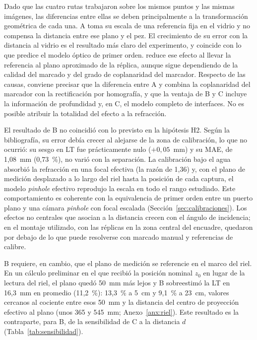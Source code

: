 Dado que las cuatro rutas trabajaron sobre los mismos puntos y las mismas imágenes, las diferencias entre ellas se deben principalmente a la transformación geométrica de cada una. A toma su escala de una referencia fija en el vidrio y no compensa la distancia entre ese plano y el pez. El crecimiento de su error con la distancia al vidrio es el resultado más claro del experimento, y coincide con lo que predice el modelo óptico de primer orden. \Aprime{} reduce ese efecto al llevar la referencia al plano aproximado de la réplica, aunque sigue dependiendo de la calidad del marcado y del grado de coplanaridad del marcador. Respecto de las causas, conviene precisar que la diferencia entre A y \Aprime{} combina la coplanaridad del marcador con la rectificación por homografía, y que la ventaja de B y C incluye la información de profundidad y, en C, el modelo completo de interfaces. No es posible atribuir la totalidad del efecto a la refracción.

El resultado de B no coincidió con lo previsto en la hipótesis H2. Según la bibliografía, su error debía crecer al alejarse de la zona de calibración, lo que no ocurrió: su sesgo en LT fue prácticamente nulo ($+0{,}05$~mm) y su MAE, de 1,08~mm (0,73~\%), no varió con la separación. La calibración bajo el agua absorbió la refracción en una focal efectiva (la razón de 1,36) y, con el plano de medición desplazado a lo largo del riel hasta la posición de cada captura, el modelo \emph{pinhole} efectivo reprodujo la escala en todo el rango estudiado. Este comportamiento es coherente con la equivalencia de primer orden entre un puerto plano y una cámara \emph{pinhole} con focal escalada (Sección~\ref{sec:calibraciones}). Los efectos no centrales que \textcite{Rofallski2022} asocian a la distancia crecen con el ángulo de incidencia; en el montaje utilizado, con las réplicas en la zona central del encuadre, quedaron por debajo de lo que puede resolverse con marcado manual y referencias de calibre.

B requiere, en cambio, que el plano de medición se referencie en el marco del riel. En un cálculo preliminar en el que recibió la posición nominal $z_0$ en lugar de la lectura del riel, el plano quedó 50~mm más lejos y B sobreestimó la LT en 16,3~mm en promedio (11,2~\%): 13,3~\% a 5~cm y 9,1~\% a 23~cm, valores cercanos al cociente entre esos 50~mm y la distancia del centro de proyección efectivo al plano (unos 365 y 545~mm; Anexo~\ref{anx:riel}). Este resultado es la contraparte, para B, de la sensibilidad de C a la distancia $d$ (Tabla~\ref{tab:sensibilidad}).

